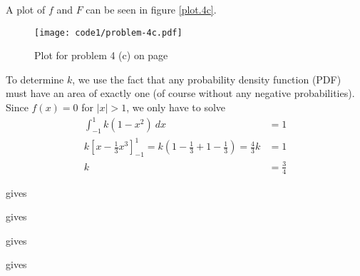 \documentclass[a4paper,english,12pt]{article}
\begin{document}

A plot of $f$ and $F$ can be seen in figure \vref{plot.4c}.
\begin{figure}[h]
  \texttt{[image: code1/problem-4c.pdf]}
  \caption{Plot for problem 4 (c) on page \pageref{problem.4 (c)}}
  \label{plot.4c}
\end{figure}

To determine $k$, we use the fact that any probability density function (PDF)
must have an area of exactly one (of course without any negative
probabilities). Since $f(x) = 0$ for $|x| > 1$, we only have to solve
\begin{align*}
  \int_{-1}^{1}{k(1-x^2)~dx} &= 1 \\
  k\left[ x - \frac{1}{3}{x^3} \right]_{-1}^{1} =
  k\left( 1 - \frac{1}{3} + 1 - \frac{1}{3} \right) = \frac{4}{3}k &= 1 \\
   k &= \frac{3}{4}
\end{align*}






\texttt{} gives
\texttt{}

\texttt{} gives
\texttt{}

 gives
\texttt{}

\texttt{} gives
\texttt{}

\end{document}
